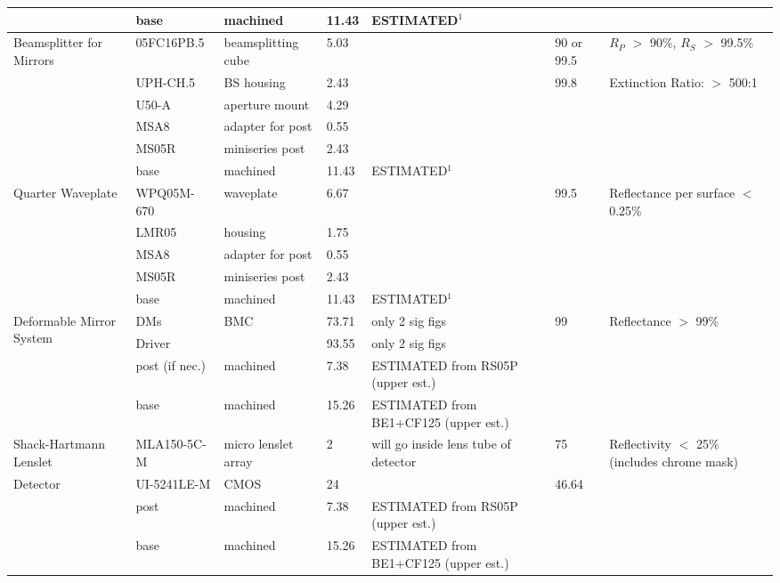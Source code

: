 \documentclass[12pt]{article}
\begin{document}
\begin{landscape}
\begin{center}
\begin{longtable}{| p{3.25cm} | p{2.2cm} | p{3cm} | p{1.75cm} | p{2.5cm} | p{1.55cm} | p{5cm} |}
          & base  & machined & 11.43 & ESTIMATED$^1$ &       &  \\ \hline
    \multirow{6}{*}{\parbox{3.25cm}{Beamsplitter for Mirrors}} & 05FC16PB.5 & beamsplitting cube & 5.03  &       & 90 or 99.5 & $R_P$ $>$ 90\%, $R_S$ $>$ 99.5\% \\ 
          & UPH-CH.5 & BS housing & 2.43  &       & 99.8  & Extinction Ratio: $>$ 500:1 \\
          & U50-A & aperture mount & 4.29  &       &       &  \\
          & MSA8  & adapter for post & 0.55  &       &       &  \\
          & MS05R & miniseries post & 2.43  &       &       &  \\
          & base  & machined & 11.43 & ESTIMATED$^1$ &       &  \\ \hline
    \multirow{5}{*}{\parbox{3.25cm}{Quarter Waveplate}} & WPQ05M-670 & waveplate & 6.67  &       & 99.5  & Reflectance per surface $<$ 0.25\% \\ 
          & LMR05 & housing & 1.75  &       &       &  \\
          & MSA8  & adapter for post & 0.55  &       &       &  \\
          & MS05R & miniseries post & 2.43  &       &       &  \\
          & base  & machined & 11.43 & ESTIMATED$^1$ &       &  \\ \hline
    \multirow{4}{*}{\parbox{3.25cm}{Deformable Mirror System}} & DMs   & BMC   & 73.71 & only 2 sig figs & 99    & Reflectance $>$ 99\% \\ 
          & Driver &       & 93.55 & only 2 sig figs &       &  \\
          & post (if nec.) & machined & 7.38  & ESTIMATED from RS05P (upper est.) &       &  \\
          & base  & machined & 15.26 & ESTIMATED from BE1+CF125 (upper est.) &       &  \\ \hline
    Shack-Hartmann Lenslet & MLA150-5C-M & micro lenslet array & 2     & will go inside lens tube of detector & 75    & Reflectivity $<$ 25\% (includes chrome mask) \\ \hline
    \multirow{3}{*}{Detector} & UI-5241LE-M & CMOS  & 24    &       & 46.64 &  \\ 
          & post  & machined & 7.38  & ESTIMATED from RS05P (upper est.) &       &  \\
          & base  & machined & 15.26 & ESTIMATED from BE1+CF125 (upper est.) &       &  \\ \hline

\end{longtable}
\end{center}
\end{landscape}
\end{document}
